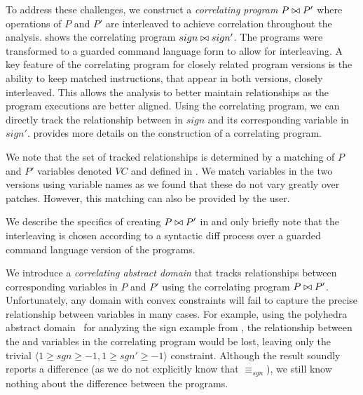  To address these challenges, we construct a \emph{correlating program} $P \bowtie P'$ where operations of $P$ and $P'$ are interleaved to achieve correlation throughout the analysis.  shows the correlating program $sign \bowtie sign'$. The programs were transformed to a guarded command language form to allow for interleaving. A key feature of the correlating program for closely related program versions is the ability to keep matched instructions, that appear in both versions, closely interleaved. This allows the analysis to better maintain relationships as the program executions are better aligned. Using the correlating program, we can directly track the relationship between  in $sign$ and its corresponding variable  in $sign'$.  provides more details on the construction of a correlating program.
%

We note that the set of tracked relationships is determined by a matching of $P$ and $P'$ variables denoted $VC$ and defined in . We match variables in the two versions using variable names as we found that these do not vary greatly over patches. However, this matching can also be provided by the user.

We describe the specifics of creating $P \bowtie P'$ in  and only briefly note that the interleaving is chosen according to a syntactic diff process over a guarded command language version of the programs.

We introduce a \emph{correlating abstract domain} that tracks relationships between corresponding variables in $P$ and $P'$ using the correlating program $P \bowtie P'$. Unfortunately, any domain with convex constraints will fail to capture the precise relationship between variables in many cases. For example, using the polyhedra abstract domain~\cite{CousotHalbwachs78} for analyzing the sign example from , the relationship between the  and  variables in the correlating program would be lost, leaving only the trivial $\langle 1 \geq sgn \geq -1, 1 \geq sgn' \geq -1 \rangle$ constraint. Although the result soundly reports a difference (as we do not explicitly know that $\equiv_{sgn}$), we still know nothing about the difference between the programs.

